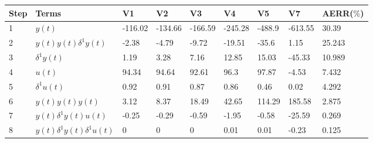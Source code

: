 \begin{tabular}{lllllllll}
Step & Terms & V1 & V2 & V3 & V4 & V5 & V7 & AERR($\%$) \\ 
\hline 
1 & $y(t)$ & -116.02 & -134.66 & -166.59 & -245.28 & -488.9 & -613.55 & 30.39 \\ 
2 & $y(t)y(t)\delta^1 y(t)$ & -2.38 & -4.79 & -9.72 & -19.51 & -35.6 & 1.15 & 25.243 \\ 
3 & $\delta^1 y(t)$ & 1.19 & 3.28 & 7.16 & 12.85 & 15.03 & -45.33 & 10.989 \\ 
4 & $u(t)$ & 94.34 & 94.64 & 92.61 & 96.3 & 97.87 & -4.53 & 7.432 \\ 
5 & $\delta^1 u(t)$ & 0.92 & 0.91 & 0.87 & 0.86 & 0.46 & 0.02 & 4.292 \\ 
6 & $y(t)y(t)y(t)$ & 3.12 & 8.37 & 18.49 & 42.65 & 114.29 & 185.58 & 2.875 \\ 
7 & $y(t)\delta^1 y(t)u(t)$ & -0.25 & -0.29 & -0.59 & -1.95 & -0.58 & -25.59 & 0.269 \\ 
8 & $y(t)\delta^1 y(t)\delta^1 u(t)$ & 0 & 0 & 0 & 0.01 & 0.01 & -0.23 & 0.125 \\ 
\hline 
\end{tabular}